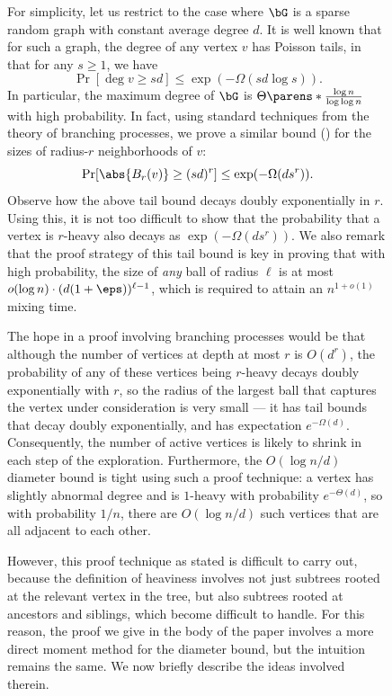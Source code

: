 \documentclass[11pt,letterpaper]{article}
\begin{document}
\begin{figure}
For simplicity, let us restrict to the case where $\bG$ is a sparse random graph with constant average degree $d$. 
It is well known that for such a graph, the degree of any vertex $v$ has Poisson tails, in that for any $s \ge 1$, we have
\[
    \Pr[\deg{v} \ge sd] \le \exp(-\Omega(sd\log s)).
\]
In particular, the maximum degree of $\bG$ is $\Theta\parens*{\frac{\log n}{\log \log n}}$ with high probability.
In fact, using standard techniques from the theory of branching processes, we prove a similar bound () for the sizes of radius-$r$ neighborhoods of $v$:
\[
    \Pr[\abs{B_{r}(v)} \ge (sd)^{r}] \le \exp(-\Omega(ds^{r})).
\]
Observe how the above tail bound decays doubly exponentially in $r$. Using this, it is not too difficult to show that the probability that a vertex is $r$-heavy also decays as $\exp\left( -\Omega(ds^r) \right)$. We also remark that the proof strategy of this tail bound is key in proving that with high probability, the size of \textit{any} ball of radius $\ell$ is at most $o(\log n) \cdot (d(1+\eps))^{\ell-1}$, which is required to attain an $n^{1+o(1)}$ mixing time.

The hope in a proof involving branching processes would be that although the number of vertices at depth at most $r$ is $O(d^r)$, the probability of any of these vertices being $r$-heavy decays doubly exponentially with $r$, so the radius of the largest ball that captures the vertex under consideration is very small --- it has tail bounds that decay doubly exponentially, and has expectation $e^{-\Omega(d)}$. Consequently, the number of active vertices is likely to shrink in each step of the exploration. Furthermore, the $O(\log n/d)$ diameter bound is tight using such a proof technique: a vertex has slightly abnormal degree and is $1$-heavy with probability $e^{-\Theta(d)}$, so with probability $1/n$, there are $O(\log n/d)$ such vertices that are all adjacent to each other.

However, this proof technique as stated is difficult to carry out, because the definition of heaviness involves not just subtrees rooted at the relevant vertex in the tree, but also subtrees rooted at ancestors and siblings, which become difficult to handle.
For this reason, the proof we give in the body of the paper involves a more direct moment method for the diameter bound, but the intuition remains the same. We now briefly describe the ideas involved therein.


\end{figure}
\end{document}

